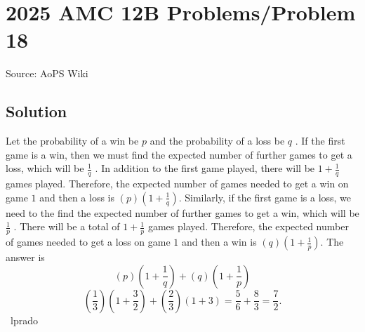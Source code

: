 \documentclass[12pt]{article}
\begin{document}
\section*{{2025 AMC 12B Problems/Problem 18}}
Source: AoPS Wiki

\subsection*{Solution}
Let the probability of a win be $p$ and the probability of a loss be $q$ . If the first game is a win, then we must find the expected number of further games to get a loss, which will be $\frac{1}{q}$ . In addition to the first game played, there will be $1+\frac{1}{q}$ games played. Therefore, the expected number of games needed to get a win on game $1$ and then a loss is $(p)\left(1+\frac{1}{q}\right).$ Similarly, if the first game is a loss, we need to the find the expected number of further games to get a win, which will be $\frac{1}{p}$ . There will be a total of $1+\frac{1}{p}$ games played. Therefore, the expected number of games needed to get a loss on game $1$ and then a win is $(q)\left(1+\frac{1}{p}\right).$ The answer is \[(p)\left(1+\frac{1}{q}\right) + (q)\left(1+\frac{1}{p}\right)\] \[\left(\frac{1}{3}\right) \left(1+\frac{3}{2}\right) + \left(\frac{2}{3}\right)(1+3) = \frac{5}{6} + \frac{8}{3} = \boxed{\frac{7}{2}}.\] ~lprado
\end{document}
